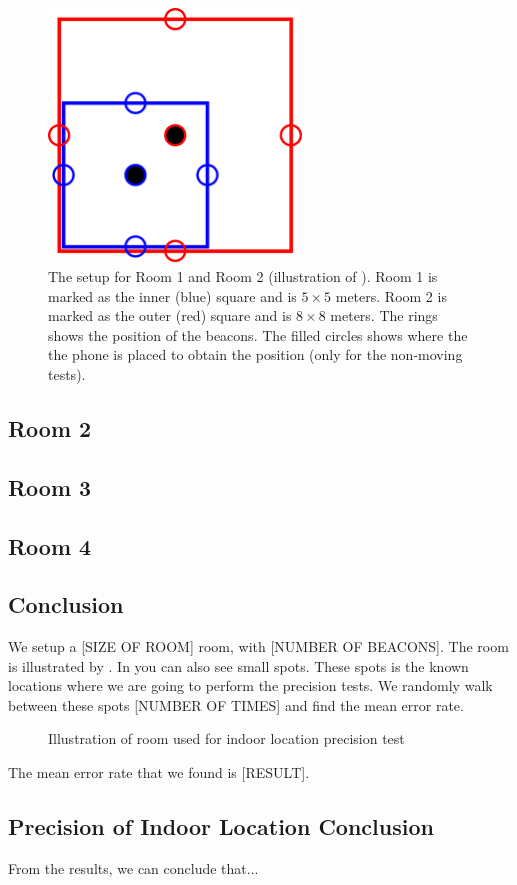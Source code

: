 \begin{figure}[!htb]
    \centering
    \includegraphics[width=0.6\textwidth]{drawings/audtestsetup}
    \caption{The setup for Room 1 and Room 2 (illustration of ). Room 1 is marked as the inner (blue) square and is $5 \times 5$ meters. Room 2 is marked as the outer (red) square and is $8 \times 8$ meters. The rings shows the position of the beacons. The filled circles shows where the the phone is placed to obtain the position (only for the non-moving tests).}
    \label{fig:audtestsetup}
\end{figure}

\FloatBarrier
\subsection{Room 2}

\subsection{Room 3}

\subsection{Room 4}

\subsection{Conclusion}


We setup a [SIZE OF ROOM] room, with [NUMBER OF BEACONS]. 
The room is illustrated by . 
In  you can also see small spots. 
These spots is the known locations where we are going to perform the precision tests. 
We randomly walk between these spots [NUMBER OF TIMES] and find the mean error rate.
\begin{figure}[!htb]
    \centering
    \caption{Illustration of room used for indoor location precision test}
    \label{fig:precisiontest}
\end{figure}

The mean error rate that we found is [RESULT]. 

\subsection{Precision of Indoor Location Conclusion}
From the results, we can conclude that... 


